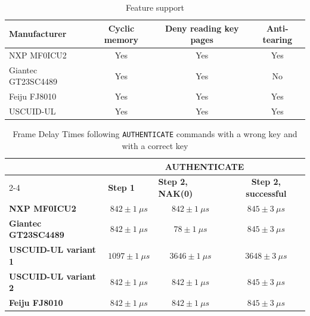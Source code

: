 \documentclass[10pt,letterpaper]{article}
\begin{document}
\begin{table}[h]
\caption{Feature support}
\label{tab:features}
\centering
\begin{tabular}{|l|c|c|c|}
\hline
\textbf{Manufacturer} & \textbf{Cyclic memory} & \textbf{Deny reading key pages} & \textbf{Anti-tearing} \\
\hline
NXP MF0ICU2 & Yes & Yes & Yes \\
\hline
Giantec GT23SC4489 & Yes & Yes & No \\
\hline
Feiju FJ8010 & Yes & Yes & Yes\footnotemark \\
\hline
USCUID-UL & Yes & Yes & Yes \\
\hline
\end{tabular}
\end{table}
\begin{table}[h]
\caption{Frame Delay Times following \texttt{AUTHENTICATE} commands with a wrong key and with a correct key}
\label{tab:timings}
\centering
\begin{tabular}{l|ccc}
                 & \multicolumn{3}{c}{\textbf{AUTHENTICATE}}                       \\ \cline{2-4} 
                       & \multicolumn{1}{l|}{\textbf{Step 1}} & \multicolumn{1}{l|}{\textbf{Step 2, NAK(0)}} & \textbf{Step 2, successful} \\ \hline
\textbf{NXP MF0ICU2}     & \multicolumn{1}{c|}{$842\pm1~{\mu}s$} & \multicolumn{1}{c|}{$842\pm1~{\mu}s$} & $845\pm3~{\mu}s$ \\
\textbf{Giantec GT23SC4489} & \multicolumn{1}{c|}{$842\pm1~{\mu}s$} & \multicolumn{1}{c|}{\boldmath$78\pm1~{\mu}s$}  & $845\pm3~{\mu}s$ \\
\textbf{USCUID-UL variant 1} & \multicolumn{1}{c|}{\boldmath$1097\pm1~{\mu}s$}           & \multicolumn{1}{c|}{\boldmath$3646\pm1~{\mu}s$}                & \boldmath$3648\pm3~{\mu}s$ \\
\textbf{USCUID-UL variant 2}     & \multicolumn{1}{c|}{$842\pm1~{\mu}s$} & \multicolumn{1}{c|}{$842\pm1~{\mu}s$} & $845\pm3~{\mu}s$ \\
\textbf{Feiju FJ8010}     & \multicolumn{1}{c|}{$842\pm1~{\mu}s$} & \multicolumn{1}{c|}{$842\pm1~{\mu}s$} & $845\pm3~{\mu}s$
\end{tabular}
\end{table}

\small

\pagebreak
\end{document}
